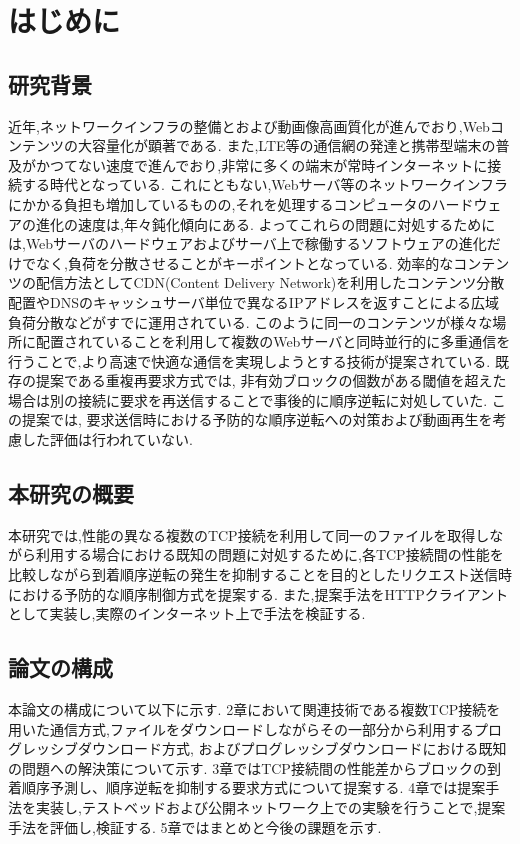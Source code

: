 \documentclass[a4j,12pt]{gradthesis_utf8}
\begin{document}
 
\maketitle %

\chapter{はじめに}\label{sec:sec1}
\section{研究背景}
近年,ネットワークインフラの整備とおよび動画像高画質化が進んでおり,Webコンテンツの大容量化が顕著である.
また,LTE等の通信網の発達と携帯型端末の普及がかつてない速度で進んでおり,非常に多くの端末が常時インターネットに接続する時代となっている.
これにともない,Webサーバ等のネットワークインフラにかかる負担も増加しているものの,それを処理するコンピュータのハードウェアの進化の速度は,年々鈍化傾向にある.
よってこれらの問題に対処するためには,Webサーバのハードウェアおよびサーバ上で稼働するソフトウェアの進化だけでなく,負荷を分散させることがキーポイントとなっている.
効率的なコンテンツの配信方法としてCDN(Content Delivery Network)を利用したコンテンツ分散配置やDNSのキャッシュサーバ単位で異なるIPアドレスを返すことによる広域負荷分散などがすでに運用されている.
このように同一のコンテンツが様々な場所に配置されていることを利用して複数のWebサーバと同時並行的に多重通信を行うことで,より高速で快適な通信を実現しようとする技術が提案されている.
既存の提案である重複再要求方式では, 
非有効ブロックの個数がある閾値を超えた場合は別の接続に要求を再送信することで事後的に順序逆転に対処していた.
この提案では, 要求送信時における予防的な順序逆転への対策および動画再生を考慮した評価は行われていない.

\section{本研究の概要}
本研究では,性能の異なる複数のTCP接続を利用して同一のファイルを取得しながら利用する場合における既知の問題に対処するために,各TCP接続間の性能を比較しながら到着順序逆転の発生を抑制することを目的としたリクエスト送信時における予防的な順序制御方式を提案する.
また,提案手法をHTTPクライアントとして実装し,実際のインターネット上で手法を検証する.

\section{論文の構成}
本論文の構成について以下に示す.
2章において関連技術である複数TCP接続を用いた通信方式,ファイルをダウンロードしながらその一部分から利用するプログレッシブダウンロード方式, およびプログレッシブダウンロードにおける既知の問題への解決策について示す.
3章ではTCP接続間の性能差からブロックの到着順序予測し、順序逆転を抑制する要求方式について提案する.
4章では提案手法を実装し,テストベッドおよび公開ネットワーク上での実験を行うことで,提案手法を評価し,検証する.
5章ではまとめと今後の課題を示す.
\end{document}
